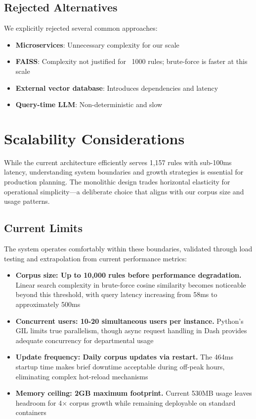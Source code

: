 \subsection{Rejected Alternatives}

We explicitly rejected several common approaches:

\begin{itemize}[leftmargin=*,itemsep=2pt,topsep=2pt]
  \item \textbf{Microservices}: Unnecessary complexity for our scale
  \item \textbf{FAISS}: Complexity not justified for ~1000 rules; brute-force is faster at this scale
  \item \textbf{External vector database}: Introduces dependencies and latency
  \item \textbf{Query-time LLM}: Non-deterministic and slow
\end{itemize}

\section{Scalability Considerations}

While the current architecture efficiently serves 1,157 rules with sub-100ms latency, understanding system boundaries and growth strategies is essential for production planning. The monolithic design trades horizontal elasticity for operational simplicity—a deliberate choice that aligns with our corpus size and usage patterns.

\subsection{Current Limits}

The system operates comfortably within these boundaries, validated through load testing and extrapolation from current performance metrics:

\begin{itemize}[leftmargin=*,itemsep=3pt,topsep=3pt]
  \item \textbf{Corpus size: Up to 10,000 rules before performance degradation.} Linear search complexity in brute-force cosine similarity becomes noticeable beyond this threshold, with query latency increasing from 58ms to approximately 500ms
  \item \textbf{Concurrent users: 10-20 simultaneous users per instance.} Python's GIL limits true parallelism, though async request handling in Dash provides adequate concurrency for departmental usage
  \item \textbf{Update frequency: Daily corpus updates via restart.} The 464ms startup time makes brief downtime acceptable during off-peak hours, eliminating complex hot-reload mechanisms
  \item \textbf{Memory ceiling: 2GB maximum footprint.} Current 530MB usage leaves headroom for 4× corpus growth while remaining deployable on standard containers
\end{itemize}

